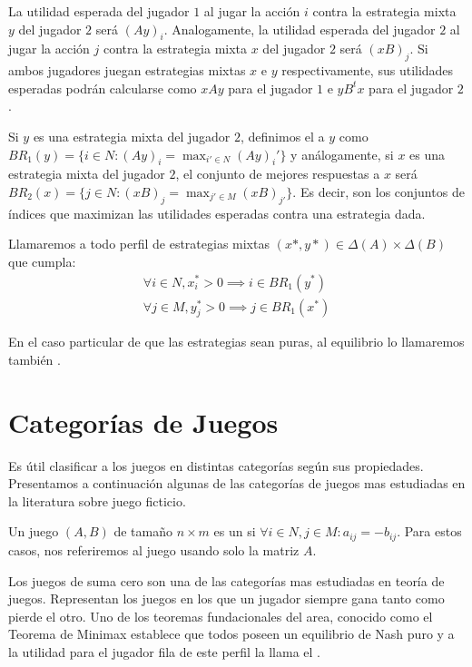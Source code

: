 La utilidad esperada del jugador $1$ al jugar la acción $i$ contra la estrategia mixta $y$ del jugador $2$ será $(Ay)_i$. Analogamente, la utilidad esperada del jugador $2$ al jugar la acción $j$ contra la estrategia mixta $x$ del jugador $2$ será $(xB)_j$. Si ambos jugadores juegan estrategias mixtas $x$ e $y$ respectivamente, sus utilidades esperadas podrán calcularse como $xAy$ para el jugador $1$ e $yB^tx$ para el jugador $2$.

Si $y$ es una estrategia mixta del jugador $2$, definimos el  a $y$ como $BR_1(y) = \{i \in N : (Ay)_i = \max_{i' \in N} (Ay)_i'\}$ y análogamente, si $x$ es una estrategia mixta del jugador $2$, el conjunto de mejores respuestas a $x$ será $BR_2(x) = \{j \in N : (xB)_j = \max_{j' \in M} (xB)_{j'}\}$. Es decir, son los conjuntos de índices que maximizan las utilidades esperadas contra una estrategia dada.

Llamaremos  a todo perfil de estrategias mixtas $(x*, y*) \in \Delta(A) \times \Delta(B)$ que cumpla:
\begin{gather}
    \forall i \in N, x^*_i > 0 \implies i \in BR_1(y^*) \\
    \forall j \in M, y^*_j > 0 \implies j \in BR_1(x^*)
\end{gather}

En el caso particular de que las estrategias sean puras, al equilibrio lo llamaremos también .


\section{Categorías de Juegos}

Es útil clasificar a los juegos en distintas categorías según sus propiedades. Presentamos a continuación algunas de las categorías de juegos mas estudiadas en la literatura sobre juego ficticio.

\begin{definition}
    Un juego $(A, B)$ de tamaño $n \times m$ es un  si $\forall i \in N, j \in M : a_{ij} = -b_{ij}$. Para estos casos, nos referiremos al juego usando solo la matriz $A$.
\end{definition}

Los juegos de suma cero son una de las categorías mas estudiadas en teoría de juegos. Representan los juegos en los que un jugador siempre gana tanto como pierde el otro. Uno de los teoremas fundacionales del area, conocido como el Teorema de Minimax \cite{nash:minmax} establece que todos poseen un equilibrio de Nash puro y a la utilidad para el jugador fila de este perfil la llama el .

